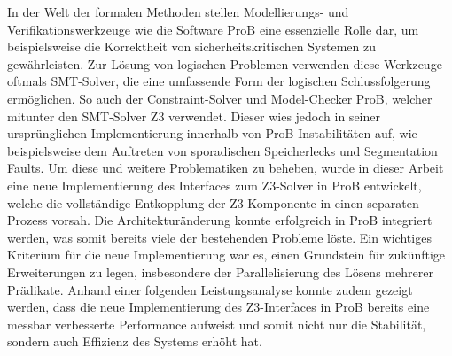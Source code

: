 
In der Welt der formalen Methoden stellen Modellierungs- und Verifikationswerkzeuge wie die Software ProB eine essenzielle Rolle dar,
um beispielsweise die Korrektheit von sicherheitskritischen Systemen zu gewährleisten.
Zur Lösung von logischen Problemen verwenden diese Werkzeuge oftmals SMT-Solver, die eine umfassende Form der logischen Schlussfolgerung ermöglichen.
So auch der Constraint-Solver und Model-Checker ProB, welcher mitunter den SMT-Solver Z3 verwendet.
Dieser wies jedoch in seiner ursprünglichen Implementierung innerhalb von ProB Instabilitäten auf, wie beispielsweise dem Auftreten von sporadischen Speicherlecks und Segmentation Faults.
Um diese und weitere Problematiken zu beheben, wurde in dieser Arbeit eine neue Implementierung des Interfaces zum Z3-Solver in ProB entwickelt, welche
die vollständige Entkopplung der Z3-Komponente in einen separaten Prozess vorsah.
Die Architekturänderung konnte erfolgreich in ProB integriert werden, was somit bereits viele der bestehenden Probleme löste.
Ein wichtiges Kriterium für die neue Implementierung war es, einen Grundstein für zukünftige Erweiterungen zu legen, insbesondere der Parallelisierung des Lösens mehrerer Prädikate.
Anhand einer folgenden Leistungsanalyse konnte zudem gezeigt werden, dass die neue Implementierung des Z3-Interfaces
in ProB bereits eine messbar verbesserte Performance aufweist und somit nicht nur die Stabilität, sondern auch Effizienz des Systems erhöht hat.

